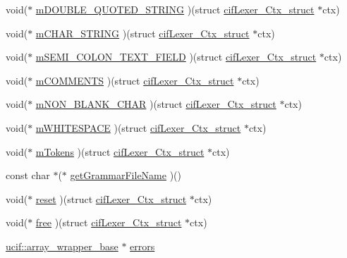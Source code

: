 \begin{DoxyCompactItemize}
\item 
void($\ast$ \hyperlink{structcif_lexer___ctx__struct_abf2086c5abd70faf7d34c10a27981961}{m\-D\-O\-U\-B\-L\-E\-\_\-\-Q\-U\-O\-T\-E\-D\-\_\-\-S\-T\-R\-I\-N\-G} )(struct \hyperlink{structcif_lexer___ctx__struct}{cif\-Lexer\-\_\-\-Ctx\-\_\-struct} $\ast$ctx)
\item 
void($\ast$ \hyperlink{structcif_lexer___ctx__struct_a416dc4bbfba66221f0cda6fbb3de7527}{m\-C\-H\-A\-R\-\_\-\-S\-T\-R\-I\-N\-G} )(struct \hyperlink{structcif_lexer___ctx__struct}{cif\-Lexer\-\_\-\-Ctx\-\_\-struct} $\ast$ctx)
\item 
void($\ast$ \hyperlink{structcif_lexer___ctx__struct_a63825fecb7363d929bcc90bcad924f57}{m\-S\-E\-M\-I\-\_\-\-C\-O\-L\-O\-N\-\_\-\-T\-E\-X\-T\-\_\-\-F\-I\-E\-L\-D} )(struct \hyperlink{structcif_lexer___ctx__struct}{cif\-Lexer\-\_\-\-Ctx\-\_\-struct} $\ast$ctx)
\item 
void($\ast$ \hyperlink{structcif_lexer___ctx__struct_a85596d7d3fea310b5fa527cff1aa6125}{m\-C\-O\-M\-M\-E\-N\-T\-S} )(struct \hyperlink{structcif_lexer___ctx__struct}{cif\-Lexer\-\_\-\-Ctx\-\_\-struct} $\ast$ctx)
\item 
void($\ast$ \hyperlink{structcif_lexer___ctx__struct_ac7a4e9746159f72a6a550ac5cef3c65a}{m\-N\-O\-N\-\_\-\-B\-L\-A\-N\-K\-\_\-\-C\-H\-A\-R} )(struct \hyperlink{structcif_lexer___ctx__struct}{cif\-Lexer\-\_\-\-Ctx\-\_\-struct} $\ast$ctx)
\item 
void($\ast$ \hyperlink{structcif_lexer___ctx__struct_ad88575ebe99c434289ba6379fe71b5aa}{m\-W\-H\-I\-T\-E\-S\-P\-A\-C\-E} )(struct \hyperlink{structcif_lexer___ctx__struct}{cif\-Lexer\-\_\-\-Ctx\-\_\-struct} $\ast$ctx)
\item 
void($\ast$ \hyperlink{structcif_lexer___ctx__struct_a5a963de00b655ae5eaa9d6cc97034ee0}{m\-Tokens} )(struct \hyperlink{structcif_lexer___ctx__struct}{cif\-Lexer\-\_\-\-Ctx\-\_\-struct} $\ast$ctx)
\item 
const char $\ast$($\ast$ \hyperlink{structcif_lexer___ctx__struct_a2c8792523032943d9b8c91ba037304e5}{get\-Grammar\-File\-Name} )()
\item 
void($\ast$ \hyperlink{structcif_lexer___ctx__struct_a90320165e0a99885405cc155dc6bddac}{reset} )(struct \hyperlink{structcif_lexer___ctx__struct}{cif\-Lexer\-\_\-\-Ctx\-\_\-struct} $\ast$ctx)
\item 
void($\ast$ \hyperlink{structcif_lexer___ctx__struct_affa283e9b8b2093f848f7cec0f786ec3}{free} )(struct \hyperlink{structcif_lexer___ctx__struct}{cif\-Lexer\-\_\-\-Ctx\-\_\-struct} $\ast$ctx)
\item 
\hyperlink{structucif_1_1array__wrapper__base}{ucif\-::array\-\_\-wrapper\-\_\-base} $\ast$ \hyperlink{structcif_lexer___ctx__struct_a4dbe3e19dba9d5aa9b5097ba30fb645f}{errors}
\end{DoxyCompactItemize}


